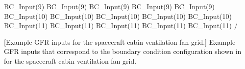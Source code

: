 \begin{minipage}{\textwidth}
\begin{nmldescitem}[%
   fontupper=\ttfamily\footnotesize%
  ,listing options={escapeinside={!@}{!@}}%
]
  BC_Input(9)%
  BC_Input(9)%
  BC_Input(9)%
  BC_Input(9)%
  BC_Input(9)%
  BC_Input(10)%
  BC_Input(10)%
  BC_Input(10)%
  BC_Input(10)%
  BC_Input(10)%
  BC_Input(11)%
  BC_Input(11)%
  BC_Input(11)%
  BC_Input(11)%
  BC_Input(11)%
/
\end{nmldescitem}
            [Example GFR inputs for the spacecraft cabin ventilation fan grid.]%
            {Example GFR inputs that correspond to the boundary condition
             configuration shown in  for the
             spacecraft cabin ventilation fan grid.}
  \label{TBL:Files:Spacefan:BCInputs}
\end{minipage}



